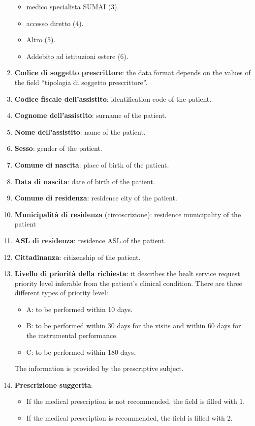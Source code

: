 \documentclass[paper=a4, fontsize=11pt]{scrartcl} %
\numberwithin{equation}{section} %
\numberwithin{figure}{section} %
\numberwithin{table}{section} %
\begin{document}
\begin{enumerate}
\begin{itemize}
\item medico specialista SUMAI (3).
\item accesso diretto (4).
\item Altro (5).
\item Addebito ad istituzioni estere (6).
\end{itemize}
\item \textbf{Codice di soggetto prescrittore}: the data format depends on the values of the field ``tipologia di soggetto prescrittore''.
\item \textbf{Codice fiscale dell'assistito}: identification code of the patient.
\item \textbf{Cognome dell'assistito}: surname of the patient.
\item \textbf{Nome dell'assistito}: name of the patient.
\item \textbf{Sesso}: gender of the patient.
\item \textbf{Comune di nascita}: place of birth of the patient.
\item \textbf{Data di nascita}: date of birth of the patient.
\item \textbf{Comune di residenza}: residence city of the patient.
\item \textbf{Municipalità di residenza} (circoscrizione): residence municipality of the patient
\item \textbf{ASL di residenza}: residence ASL of the patient.
\item \textbf{Cittadinanza}: citizenship of the patient. %
\item \textbf{Livello di priorità della richiesta}: it describes the healt service request priority level inferable from the patient's clinical condition. There are three different types of priority level:
\begin{itemize}
\item A: to be performed within 10 days.
\item B: to be performed within 30 days for the visits and within 60 days for the instrumental performance.
\item C: to be performed within 180 days.
\end{itemize}
The information is provided by the prescriptive subject. 
\item \textbf{Prescrizione suggerita}:
\begin{itemize}
\item If the medical prescription is not recommended, the field is filled with 1.
\item If the medical prescription is recommended, the field is filled with 2.

\end{itemize}
\end{enumerate}
\end{document}

